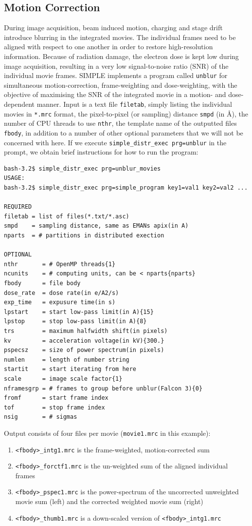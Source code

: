 \documentclass[a4paper,11pt]{article}
\newcommand{\prgname}[1]{\textcolor{NavyBlue}{\texttt{#1}}}
\begin{document}
\subsection{Motion Correction}
During image acquisition, beam induced motion, charging and stage drift introduce blurring in the integrated movies. The individual frames need to be aligned with respect to one another in order to restore high-resolution information. Because of radiation damage, the electron dose is kept low during image acquisition, resulting in a very low signal-to-noise ratio (SNR) of the individual movie frames. SIMPLE implements a program called \prgname{unblur} for simultaneous motion-correction, frame-weighting and dose-weighting, with the objective of maximising the SNR of the integrated movie in a motion- and dose-dependent manner. Input is a text file \texttt{filetab}, simply listing the individual movies in \texttt{*.mrc} format, the pixel-to-pixel (or sampling) distance \texttt{smpd} (in \AA{}), the number of CPU threads to use \texttt{nthr}, the template name of the outputted files \texttt{fbody}, in addition to a number of other optional parameters that we will not be concerned with here. If we execute \texttt{simple\_distr\_exec prg=unblur} in the prompt, we obtain brief instructions for how to run the program:
\begin{verbatim}
bash-3.2$ simple_distr_exec prg=unblur_movies
USAGE:
bash-3.2$ simple_distr_exec prg=simple_program key1=val1 key2=val2 ...

REQUIRED
filetab = list of files(*.txt/*.asc)
smpd    = sampling distance, same as EMANs apix(in A)
nparts  = # partitions in distributed exection

OPTIONAL
nthr       = # OpenMP threads{1}
ncunits    = # computing units, can be < nparts{nparts}
fbody      = file body
dose_rate  = dose rate(in e/A2/s)
exp_time   = expusure time(in s)
lpstart    = start low-pass limit(in A){15}
lpstop     = stop low-pass limit(in A){8}
trs        = maximum halfwidth shift(in pixels)
kv         = acceleration voltage(in kV){300.}
pspecsz    = size of power spectrum(in pixels)
numlen     = length of number string
startit    = start iterating from here
scale      = image scale factor{1}
nframesgrp = # frames to group before unblur(Falcon 3){0}
fromf      = start frame index
tof        = stop frame index
nsig       = # sigmas
\end{verbatim}
Output consists of four files per movie (\texttt{movie1.mrc} in this example):
\begin{enumerate}
\item \texttt{<fbody>\_intg1.mrc} is the frame-weighted, motion-corrected sum
\item \texttt{<fbody>\_forctf1.mrc} is the un-weighted sum of the aligned individual frames
\item \texttt{<fbody>\_pspec1.mrc} is the power-spectrum of the uncorrected unweighted movie sum (left) and the corrected weighted movie sum (right)
\item \texttt{<fbody>\_thumb1.mrc} is a down-scaled version of  \texttt{<fbody>\_intg1.mrc}
\end{enumerate}
\end{document}
